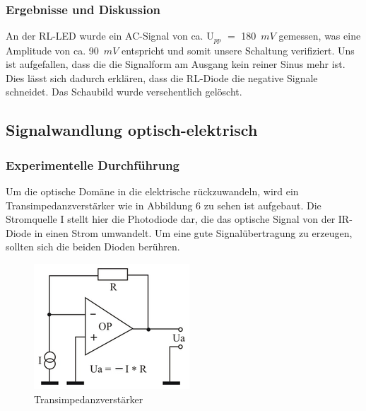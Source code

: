 \subsubsection{Ergebnisse und Diskussion}
An der RL-LED wurde ein AC-Signal von ca. U$_{pp}$ $=$ 180~$mV$ gemessen, was eine Amplitude von ca. 90~$mV$ entspricht und somit unsere Schaltung verifiziert. Uns ist aufgefallen, dass die die Signalform am Ausgang kein reiner Sinus mehr ist. Dies l\"asst sich dadurch erkl\"aren, dass die RL-Diode die negative Signale schneidet. Das Schaubild wurde versehentlich gel\"oscht.  

\subsection{Signalwandlung optisch-elektrisch}
\subsubsection{Experimentelle Durchf\"uhrung}
Um die optische Dom\"ane in die elektrische r\"uckzuwandeln, wird ein Transimpedanzverst\"arker wie in Abbildung 6 zu sehen ist aufgebaut. Die Stromquelle I stellt hier die Photodiode dar, die das optische Signal von der IR-Diode in einen Strom umwandelt. Um eine gute Signal\"ubertragung zu erzeugen, sollten sich die beiden Dioden ber\"uhren.   
\begin{figure}[!h]
\begin{center}
\includegraphics[scale=0.7]{bild/Transimpedanz}
\caption{Transimpedanzverst\"arker}
\end{center}
\end{figure}
